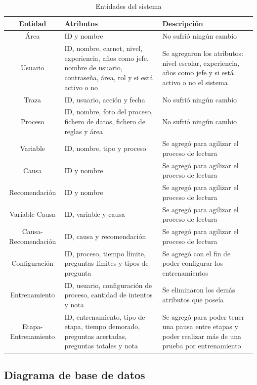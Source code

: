 \begin{table}[H]
\begin{center}
\begin{tabular}{ | c | p{5cm} |  p{5cm} | }
\hline
\textbf{Entidad} & \textbf{Atributos}  & \textbf{Descripción}\\
\hline
Área & ID y nombre & No sufrió ningún cambio \\
\hline
Usuario & ID, nombre, carnet, nivel, experiencia, años como jefe, nombre de usuario, contraseña, área, rol y si está activo o no & Se agregaron los atributos: nivel escolar, experiencia, años como jefe y si está activo o no el sistema\\
\hline
Traza & ID, usuario, acción y fecha & No sufrió ningún cambio \\
\hline
Proceso & ID, nombre, foto del proceso, fichero de datos, fichero de reglas y área & No sufrió ningún cambio \\
\hline
Variable & ID, nombre, tipo y proceso & Se agregó para agilizar el proceso de lectura \\
\hline
Causa & ID y nombre & Se agregó para agilizar el proceso de lectura \\
\hline
Recomendación & ID y nombre & Se agregó para agilizar el proceso de lectura \\
\hline
Variable-Causa & ID, variable y causa & Se agregó para agilizar el proceso de lectura \\
\hline
Causa-Recomendación & ID, causa y recomendación & Se agregó para agilizar el proceso de lectura \\
\hline
Configuración & ID, proceso, tiempo límite, preguntas límites y tipos de pregunta & Se agregó con el fin de poder configurar los entrenamientos \\
\hline
Entrenamiento & ID, usuario, configuración de proceso, cantidad de intentos y nota & Se eliminaron los demás atributos que poseía \\
\hline
Etapa-Entrenamiento & ID, entrenamiento, tipo de etapa, tiempo demorado, preguntas acertadas, preguntas totales y nota & Se agregó para poder tener una pausa entre etapas y poder realizar más de una prueba por entrenamiento \\
\hline
\end{tabular}
\caption{Entidades del sistema}
\label{tab:entidades}
\end{center}
\end{table}

\subsection{Diagrama de base de datos}